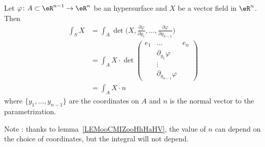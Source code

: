 \begin{proposition}     \label{PROPooETLZooAVsrwy}
	Let \( \varphi\colon A\subset \eR^{n-1}\to \eR^n\) be an hypersurface and \( X\) be a vector field in \( \eR^n\). Then
	\begin{subequations}
		\begin{align}
			\int_SX & =\int_A\det\big( X,\frac{ \partial \varphi }{ \partial y_1 },\ldots, \frac{ \partial \varphi }{ \partial y_{n-1} } \big)  \label{SUBEQooWJSPooImJjQN} \\
			        & =\int_A X\cdot\det\begin{pmatrix}
				                            e_1 & \ldots                    & e_n \\
				                                & \partial_{y_1}\varphi     &     \\
				                                & \vdots                    &     \\
				                                & \partial_{y_{n-1}}\varphi &
			                            \end{pmatrix}                                                                        \\
			        & =\int_A X\cdot n
		\end{align}
	\end{subequations}
	where \( \{ y_1,\ldots, y_{n-1} \}\) are the coordinates on \( A\) and \( n\) is the normal vector to the parametrization.
\end{proposition}
Note : thanks to lemma~\ref{LEMooCMIZooHhHaHV}, the value of \( n\) can depend on the choice of coordinates, but the integral will not depend.

